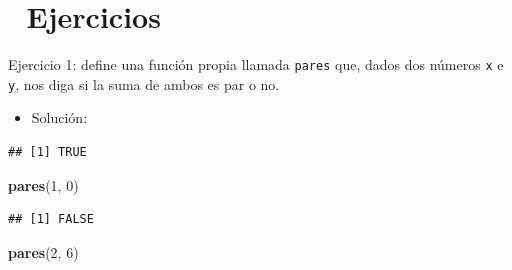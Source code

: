 \documentclass[11pt,]{book}
\newenvironment{Shaded}{\begin{snugshade}}{\end{snugshade}}
\newcommand{\CommentTok}[1]{\textcolor[rgb]{0.37,0.37,0.37}{\textit{#1}}}
\newcommand{\ControlFlowTok}[1]{\textcolor[rgb]{0.27,0.27,0.27}{\textbf{#1}}}
\newcommand{\DecValTok}[1]{\textcolor[rgb]{0.06,0.06,0.06}{#1}}
\newcommand{\KeywordTok}[1]{\textcolor[rgb]{0.27,0.27,0.27}{\textbf{#1}}}
\newcommand{\NormalTok}[1]{#1}
\newcommand{\OperatorTok}[1]{\textcolor[rgb]{0.43,0.43,0.43}{\textbf{#1}}}
\newcommand{\StringTok}[1]{\textcolor[rgb]{0.5,0.5,0.5}{#1}}
\providecommand{\tightlist}{%
  \setlength{\itemsep}{0pt}\setlength{\parskip}{0pt}}
\begin{document}
\hypertarget{ejercicios-4}{%
\section{📝 Ejercicios}\label{ejercicios-4}}

Ejercicio 1: define una función propia llamada \texttt{pares} que, dados dos números \texttt{x} e \texttt{y}, nos diga si la suma de ambos es par o no.

\begin{itemize}
\tightlist
\item
  Solución:
\end{itemize}

\begin{Shaded}
\end{Shaded}

\begin{verbatim}
## [1] TRUE
\end{verbatim}

\begin{Shaded}
\begin{Highlighting}[]
\KeywordTok{pares}\NormalTok{(}\DecValTok{1}\NormalTok{, }\DecValTok{0}\NormalTok{)}
\end{Highlighting}
\end{Shaded}

\begin{verbatim}
## [1] FALSE
\end{verbatim}

\begin{Shaded}
\begin{Highlighting}[]
\KeywordTok{pares}\NormalTok{(}\DecValTok{2}\NormalTok{, }\DecValTok{6}\NormalTok{)}
\end{Highlighting}
\end{Shaded}
\end{document}
